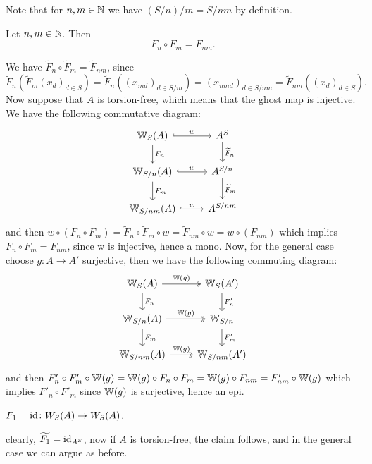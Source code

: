 Note that for $n,m \in \mathbb{N}$ we have $(S/n)/m = S/nm$ by definition.
\begin{lemma} \label{lem: F_n after F_m is F_{nm}}
    Let $n,m \in \mathbb{N}$.
    Then 
    \[F_n \circ F_m = F_{nm}.\]
\end{lemma}
\begin{beweis}
    We have $\widetilde{F}_n \circ \widetilde{F}_m = \widetilde{F}_{nm}$,
    since
    \[
       \widetilde{F}_n(\widetilde{F}_m(x_d)_{d \in S}) 
       = \widetilde{F}_n((x_{md})_{d \in S/m})
       = (x_{nmd})_{d \in S/nm}
       = \widetilde{F}_{nm}((x_d)_{d \in S}).
    \]
    Now suppose that $A$ is torsion-free, which means that the ghost map is injective.
    We have the following commutative diagram:
    \[
        \begin{tikzcd}
            \W_S(A) \arrow[r,"w",hook] \arrow[d,"F_n"] 
              & A^S \arrow[d,"\widetilde{F}_n"] \\
            \W_{S/n}(A) \arrow[r,"w",hook] \ar[d,"F_m"]
              & A^{S/n} \ar[d,"\widetilde{F}_m"]\\
            \W_{S/nm}(A) \ar[r,"w",hook]
            & A^{S/nm}
        \end{tikzcd}      
    \]
    and then $w \circ (F_n \circ F_m) = \widetilde{F}_n \circ \widetilde{F}_m \circ w 
    = \widetilde{F}_{nm} \circ w = w \circ (F_{nm})$
    which implies $F_n \circ F_m = F_{nm}$, since w is injective, hence a mono.
    Now, for the general case choose $g \colon A \to A'$ surjective, then we have the following
    commuting diagram:
    \[
        \begin{tikzcd}
            \W_S(A) \arrow[r,"\W(g)",twoheadrightarrow] \arrow[d,"F_n"] 
              & \W_S(A') \arrow[d,"F'_n"] \\
            \W_{S/n}(A) \arrow[r,"\W(g)",twoheadrightarrow] \ar[d,"F_{m}"]
              & \W_{S/n} \ar[d,"F'_m"] \\
              \W_{S/nm}(A) \ar[r,"\W(g)",twoheadrightarrow] 
              & \W_{S/nm}(A')
        \end{tikzcd}
    \]
    and then $F'_n \circ F'_m \circ \mathbb{W}(g) = \mathbb{W}(g) \circ F_n \circ F_m = \mathbb{W}(g) \circ F_{nm}
    = F'_{nm} \circ \mathbb{W}(g)$ which implies $F'_n \circ F'_m$ since $\mathbb{W}(g)$ is surjective, hence an epi.
\end{beweis}
\begin{lemma}\label{lem: F_1 = id}
    $F_1 = \operatorname{id} \colon W_S(A) \to W_S(A)$.
\end{lemma}
\begin{beweis}
    clearly, $\widetilde{F_1} = \operatorname{id}_{A^S}$, now if $A$ is torsion-free, the claim follows,
    and in the general case we can argue as before.
\end{beweis}
